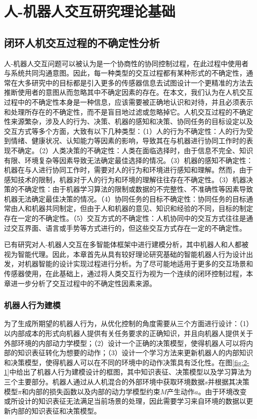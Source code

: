 \chapter{人-机器人交互研究理论基础}

\section{闭环人机交互过程的不确定性分析}
人-机器人交互问题可以被认为是一个协商性的协同控制过程，在此过程中使用者与系统共同沟通意图。因此，每一种类型的交互过程都有某种形式的不确定性，通常在大多研究中的目标都是引入更多的传感器信息去试图设计一个更精准的方法去推断使用者的意图从而忽略其中不确定因素的存在。在本文，我们认为在人机交互过程中的不确定性本身是一种信息，应该需要被正确地认识和对待，并且必须表示和处理所存在的不确定性，而不是盲目地过滤或忽略掉它。人机交互过程的不确定性来源繁杂，涉及人的行为、决策、机器的感知和决策、协同任务的目标设定以及交互方式等多个方面，大致有以下几种类型：（1）人的行为不确定性：人的行为受到情绪、健康状况、认知能力等因素的影响，导致其在与机器进行协同工作时的表现不确定。（2）人类决策的不确定性：人类在面临选择时，由于信息不完全、知识有限、环境复杂等因素导致无法确定最佳选择的情况。（3）机器的感知不确定性：机器在与人进行协同工作时，需要对人的行为和环境进行感知和理解。然而，由于感知技术的限制，机器对于人的行为和环境的理解往往存在不确定性。（3）机器决策的不确定性：由于机器学习算法的限制或数据的不完整性、不准确性等因素导致机器无法确定最佳决策的情况。（4）协同任务的目标不确定性：协同任务的目标通常由人和机器共同制定，但由于人和机器的意见、知识和经验的不同，目标的制定存在一定的不确定性。（5）交互方式的不确定性：人机协同中的交互方式往往是通过交互界面、语言或手势等方式进行的，但这些交互方式存在一定的不确定性。

已有研究对人-机器人交互在多智能体框架中进行建模分析，其中机器人和人都被视为智能代理\cite{liuDesigningRobotBehavior}。因此，本章首先从具有较好理论研究基础的智能机器人行为设计出发，对机器智能的设计实现过程进行分析。为了尽可能地适用于更多的交互场景和传感器使用，在此基础上，通过将人类交互行为视为一个连续的闭环控制过程，本章进一步分析了交互过程中的不确定性因素来源。

\subsection{机器人行为建模}
为了生成所期望的机器人行为，从优化控制的角度需要从三个方面进行设计\cite{liuDesigningRobotBehavior}：（1）以内部成本的形式向机器人提供有关任务要求的正确知识，并且向机器人提供关于外部环境的内部动力学模型；（2）设计一个正确的决策模型，使得机器人可以将内部的知识表征转化为想要的动作；（3）设计一个学习方法来更新机器人的内部知识和决策模型，使得机器人可以在不同的环境中的动作决策具有泛化性。在图\ref{fig:2-1}中给出了机器人行为建模设计的框图，其中知识表征、决策模型以及学习算法为三个主要部分。机器人通过从人机混合的外部环境中获取环境数据$s$并根据其决策模型$\pi$和内部的损失函数以及内部的动力学模型约束$M$产生动作$a$。由于环境改变或所设计的知识表征无法满足当前场景的处理，因此需要学习来自环境的数据以更新内部的知识表征和决策模型。

